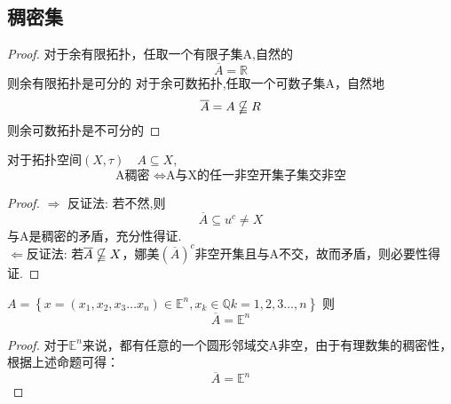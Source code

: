 \subsection*{稠密集}
\begin{proof}
    对于余有限拓扑，任取一个有限子集A,自然的 \[\overline{A}=\mathbb{R}\]
    则余有限拓扑是可分的
    对于余可数拓扑,任取一个可数子集A，自然地\[\overline{A}=A \nsubseteqq R\]
    则余可数拓扑是不可分的
\end{proof}
\begin{corollary}
    对于拓扑空间\(\left(X,\tau\right) \quad A \subseteq X\),
    \[\text{A稠密 } \Longleftrightarrow \text{A与X的任一非空开集子集交非空}\]
\end{corollary}
\begin{proof}
   \(\Rightarrow \) 反证法:
    若不然,则 \[\overline{A} \subseteq u^c \neq X\]
    与A是稠密的矛盾，充分性得证.\\
    \(\Leftarrow \)反证法:
    若\(\overline{A} \nsubseteqq X\)，娜美\({\left(\overline{A}\right)}^c\)非空开集且与A不交，故而矛盾，则必要性得证.
\end{proof}
\begin{example}
    \(A=\left\{x=\left(x_1,x_2,x_3 \dots x_n\right)\in {\mathbb{E}}^n,x_k \in \mathbb{Q} k=1,2,3 \dots,n\right\}\)
    则\[\overline{A}={\mathbb{E}^n}\]
\end{example}
\begin{proof}
    对于\({\mathbb{E}}^n\)来说，都有任意的一个圆形邻域交A非空，由于有理数集的稠密性，根据上述命题可得：\[\overline{A}={\mathbb{E}}^n\]
\end{proof}
